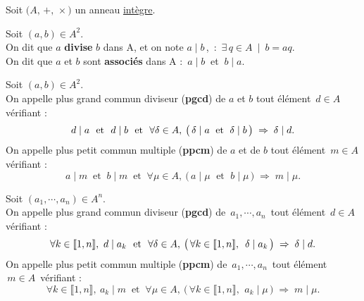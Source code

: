 \vspace{0.3cm}

\begin{center}
    Soit $\bigl(A,\,+,\,\times\bigr)$ un anneau \underline{intègre}.
\end{center}

\vspace{1cm}

Soit \((a,b)\in A^2\).\vspace{0.1cm}\\
On dit que $a$ \textbf{divise} $b$ dans A, et on note $a\mid b\,$,\, \ssi : \(\,\exists\, q\in A\ \mid \ b=aq.\)\vspace{0.1cm}\\
On dit que $a$ et $b$ sont \textbf{associés} dans A \ssi :\, $a\mid b\:$ et $\:b\mid a$.

\vspace{1.2cm}

Soit \((a,b)\in A^2\).\vspace{0.1cm}\\
On appelle plus grand commun diviseur (\textbf{pgcd}) de $a$ et $b$ tout élément $\,d\in\! A\,$ vérifiant :\vspace{-0.3cm}
\[d\mid a\ \text{ et }\ d\mid b\ \text{ et }\ \forall \delta\in A,\: \bigl(\,\delta \mid a \; \text{ et } \; \delta\mid b\, \bigr)\; \Rightarrow \; \delta \mid d.\vspace{0.1cm}\]
On appelle plus petit commun multiple (\textbf{ppcm}) de $a$ et de $b$ tout élément $\,m\in\! A\,$ vérifiant :\vspace{-0.3cm}
\[a\mid m\ \text{ et }\ b\mid m \ \text{ et }\ \forall \mu\in A,\: \bigl(\, a\mid \mu \; \text{ et }\; b\mid \mu\, \bigr)\; \Rightarrow \; m\mid \mu. \]

\vspace{1.3cm}

Soit \((a_1,\cdots,a_n)\in A^n\).\vspace{0.1cm}\\
On appelle plus grand commun diviseur (\textbf{pgcd}) de \(\,a_1,\cdots,a_n\,\) tout élément $\,d\in\! A\,$ vérifiant :\vspace{-0.3cm}
\[\forall k\in \llbracket 1,n \rrbracket,\ d\mid a_k \ \text{ et }\ \forall\delta \in A,\: \bigl(\,\forall k\in \llbracket 1,n \rrbracket,\ \, \delta \mid a_k\,\bigr)\;\Rightarrow\; \delta\mid d.\vspace{0.1cm}\]
On appelle plus petit commun multiple (\textbf{ppcm}) de \(\,a_1,\cdots,a_n\,\) tout élément $\,m\in \!A\,$ vérifiant :\vspace{-0.3cm}
\[\forall k\in \llbracket 1,n \rrbracket,\ a_k\mid m \ \text{ et }\ \forall \mu\in A,\: \bigl(\, \forall k\in \llbracket 1,n \rrbracket,\ \,a_k\mid \mu\,\bigr)\;\Rightarrow\; m\mid \mu.\]

